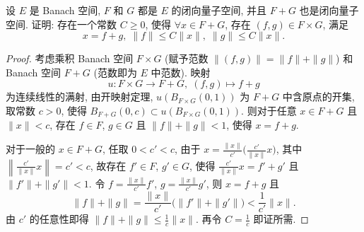


\begin{exercise}[14]
    设 $E$ 是 Banach 空间, $F$ 和 $G$ 都是 $E$ 的闭向量子空间, 并且 $F+G$
    也是闭向量子空间. 证明: 存在一个常数 $C\geq 0$, 使得 $\forall x\in F+G$,
    存在 $(f,g)\in F\times G$, 满足
    \[x=f+g,\;\|f\|\leq C\|x\|,\;\|g\|\leq C\|x\|.\]
\end{exercise}

\begin{proof}
    考虑乘积 Banach 空间 $F\times G$ (赋予范数 $\|(f,g)\|=\|f\|+\|g\|$)
    和 Banach 空间 $F+G$ (范数即为 $E$ 中范数). 映射
    \[u:F\times G\to F+G,\;(f,g)\mapsto f+g\]
    为连续线性的满射, 由开映射定理, $u(B_{F\times G}(0,1))$ 为 $F+G$ 中含原点的开集,
    取常数 $c>0$, 使得 $B_{F+G}(0,c)\subset u(B_{F\times G}(0,1))$.
    则对于任意 $x\in F+G$ 且 $\|x\|<c$, 存在 $f\in F$, $g\in G$
    且 $\|f\|+\|g\|<1$, 使得 $x=f+g$.

    对于一般的 $x\in F+G$, 任取 $0<c'<c$, 由于 $x=\frac{\|x\|}{c'}\bigl(\frac{c'}{\|x\|}x\bigr)$,
    其中 $\left\|\frac{c'}{\|x\|}x\right\|=c'<c$, 故存在 $f'\in F$, $g'\in G$,
    使得 $\frac{c'}{\|x\|}x=f'+g'$ 且 $\|f'\|+\|g'\|<1$.
    令 $f=\frac{\|x\|}{c'}f'$, $g=\frac{\|x\|}{c'}g'$, 则
    $x=f+g$ 且
    \[\|f\|+\|g\|=\frac{\|x\|}{c'}\bigl(\|f'\|+\|g'\|\bigr)<\frac{1}{c'}\|x\|.\]
    由 $c'$ 的任意性即得 $\|f\|+\|g\|\leq\frac{1}{c}\|x\|$.
    再令 $C=\frac{1}{c}$ 即证所需.
\end{proof}



